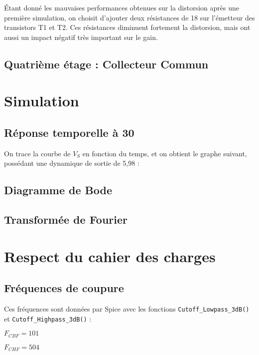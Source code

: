     Étant donné les mauvaises performances obtenues sur la distorsion après une première simulation, on choisit d'ajouter deux résistances de 18 \ohm  sur l'émetteur des transistors T1 et T2. Ces résistances diminuent fortement la distorsion, mais ont aussi un impact négatif très important sur le gain.

   \subsection{Quatrième étage : Collecteur Commun}

  \section{Simulation}
   \subsection{Réponse temporelle à 30\kilo\hertz}
    On trace la courbe de $V_S$ en fonction du temps, et on obtient le graphe suivant, possédant une dynamique de sortie de 5,98 \volt :
    
   \subsection{Diagramme de Bode}

   \subsection{Transformée de Fourier}

  \section{Respect du cahier des charges}
   \subsection{Fréquences de coupure}
    Ces fréquences sont données par Spice avec les fonctions \verb|Cutoff_Lowpass_3dB()| et \verb|Cutoff_Highpass_3dB()| :

    $F_{CBF} = 101$ \hertz

    $F_{CHF} = 504$ \kilo\hertz


